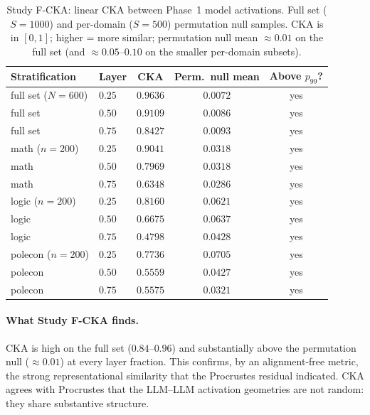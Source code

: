 \begin{table}[h]
\centering
\caption{Study F-CKA: linear CKA between Phase~1 model activations.
Full set ($S = 1000$) and per-domain ($S = 500$) permutation null
samples. CKA is in $[0, 1]$; higher = more similar; permutation null
mean $\approx 0.01$ on the full set (and $\approx 0.05$--$0.10$ on
the smaller per-domain subsets).}
\label{tab:study-f-cka}
\begin{tabular}{l l c c c}
\toprule
Stratification & Layer & CKA & Perm.\ null mean & Above $p_{99}$? \\
\midrule
full set ($N=600$)    & $0.25$ & $0.9636$ & $0.0072$ & yes \\
full set              & $0.50$ & $0.9109$ & $0.0086$ & yes \\
full set              & $0.75$ & $0.8427$ & $0.0093$ & yes \\
\midrule
math ($n=200$)        & $0.25$ & $0.9041$ & $0.0318$ & yes \\
math                  & $0.50$ & $0.7969$ & $0.0318$ & yes \\
math                  & $0.75$ & $0.6348$ & $0.0286$ & yes \\
logic ($n=200$)       & $0.25$ & $0.8160$ & $0.0621$ & yes \\
logic                 & $0.50$ & $0.6675$ & $0.0637$ & yes \\
logic                 & $0.75$ & $0.4798$ & $0.0428$ & yes \\
polecon ($n=200$)     & $0.25$ & $0.7736$ & $0.0705$ & yes \\
polecon               & $0.50$ & $0.5559$ & $0.0427$ & yes \\
polecon               & $0.75$ & $0.5575$ & $0.0321$ & yes \\
\bottomrule
\end{tabular}
\end{table}

\paragraph{What Study F-CKA finds.} CKA is high on the full set
($0.84$--$0.96$) and substantially above the permutation null
($\approx 0.01$) at every layer fraction. This confirms, by an
alignment-free metric, the strong representational similarity that
the Procrustes residual indicated. CKA agrees with Procrustes that
the LLM--LLM activation geometries are not random: they share
substantive structure.

